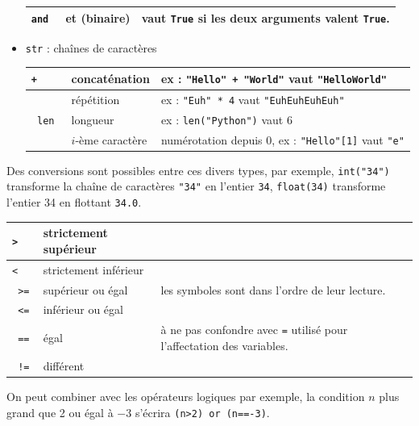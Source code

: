 \documentclass[11pt,a4paper]{article}
\begin{document}
\begin{tcolorbox}[left=0cm,title=\bf{\faPython \; Types de base et opérateurs associés},colbacktitle=cfond]
\begin{itemize}
\begin{tabularx}{\linewidth}{|>{\tt}l|l|X|}
	\hline
	and & et (binaire) & vaut {\tt True} si les deux arguments valent {\tt True}. \\
	\hline
 \end{tabularx}
	\item [\textbullet] \texttt{str} : chaînes de caractères \\
	\begin{tabularx}{\linewidth}{|>{\tt}l|l|X|}
		\hline
		+ & concaténation & ex : {\tt "Hello" + "World"} vaut {\tt "HelloWorld"}\\
		\hline
		* & répétition & ex : {\tt "Euh" * 4} vaut {\tt "EuhEuhEuhEuh"} \\
		\hline
		len & longueur & ex : {\tt len("Python")} vaut 6 \\
		\hline
		[] & $i$-ème caractère & numérotation depuis 0, ex : {\tt "Hello"[1]} vaut {\tt "e"}\\
		\hline
	 \end{tabularx}
\end{itemize}
Des conversions sont possibles entre ces divers types, par exemple, \texttt{int("34")} transforme la chaîne de caractères {\tt "34"} en l'entier {\tt 34}, \texttt{float(34)} transforme l'entier 34 en flottant {\tt 34.0}.
\end{tcolorbox}

\begin{tcolorbox}[left=0cm,title=\bf{\faPython \; Comparaison},colbacktitle=cfond]
	\begin{tabularx}{\linewidth}{|>{\tt}l|l|X|}
		\hline
		> & strictement supérieur & \\
		\hline
		< & strictement inférieur & \\
		\hline
		>= & supérieur ou égal & les symboles sont dans l'ordre de leur lecture.\\
		\hline
		<= & inférieur ou égal & \\
		\hline
		== & égal & {\small \danger} à ne pas confondre avec {\tt =} utilisé pour l'affectation des variables. \\
		\hline
		!= & différent & \\
		\hline
	\end{tabularx}
	On peut combiner avec les opérateurs logiques par exemple, la condition $n$ plus grand que 2 ou égal à $-3$ s'écrira \texttt{(n>2) or (n==-3)}.
\end{tcolorbox}
\end{document}
